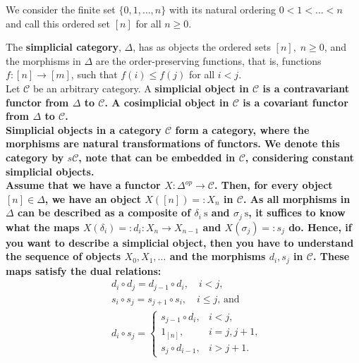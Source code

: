 We consider the finite set $\{0,1, \ldots, n\}$ with its natural ordering $0<1<\ldots<n$ and call this ordered set $[n]$ for all $n \geq 0$. 

The \textbf{simplicial category}, $\Delta$, has as objects the ordered sets $[n], \; n \geq 0$, and the morphisms in $\Delta$ are the order-preserving functions, that is, functions $f:[n] \rightarrow[m]$, such that $f(i) \leq f(j)$ for all $i<j$.\\
Let $\mathcal{C}$ be an arbitrary category. A \bf{simplicial object} in $\mathcal{C}$ is a contravariant functor from $\Delta$ to $\mathcal{C}$. A cosimplicial object in $\mathcal{C}$ is a covariant functor from $\Delta$ to $\mathcal{C}$.\\
Simplicial objects in a category $\mathcal{C}$ form a category, where the morphisms are natural transformations of functors. We denote this category by $s \mathcal{C}$, note that \cc can be embedded in $\mathcal{C}$, considering constant simplicial objects.\\




Assume that we have a functor $X: \Delta^{o p} \rightarrow \mathcal{C}$. Then, for every object $[n] \in \Delta$, we have an object $X([n])=: X_n$ in $\mathcal{C}$. As all morphisms in $\Delta$ can be described as a composite of $\delta_i \mathrm{~s}$ and $\sigma_j \mathrm{~s}$, it suffices to know what the maps $X\left(\delta_i\right)=: d_i: X_n \rightarrow X_{n-1}$ and $X\left(\sigma_j\right)=: s_j$ do. Hence, if you want to describe a simplicial object, then you have to understand the sequence of objects $X_0, X_1, \ldots$ and the morphisms $d_i, s_j$ in $\mathcal{C}$. These maps satisfy the dual relations:
$$
\begin{aligned}
& d_i \circ d_j=d_{j-1} \circ d_i, \quad i<j, \\
& s_i \circ s_j=s_{j+1} \circ s_i, \quad i \leq j \text {, and } \\
& d_i \circ s_j=\left\{\begin{array}{cl}
s_{j-1} \circ d_i, & i<j, \\
1_{[n]}, & i=j, j+1, \\
s_j \circ d_{i-1}, & i>j+1 .
\end{array}\right. \\
&
\end{aligned}
$$

